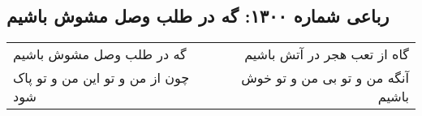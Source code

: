 \begin{center}
\section*{رباعی شماره ۱۳۰۰: گه در طلب وصل مشوش باشیم}
\label{sec:1300}
\begin{longtable}{l p{0.5cm} r}
گه در طلب وصل مشوش باشیم
&&
گاه از تعب هجر در آتش باشیم
\\
چون از من و تو این من و تو پاک شود
&&
آنگه من و تو بی من و تو خوش باشیم
\\
\end{longtable}
\end{center}

